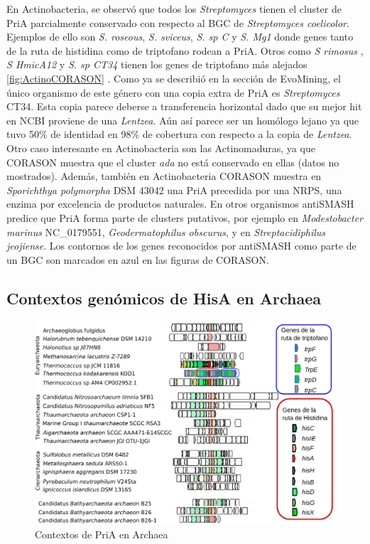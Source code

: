 \documentclass[12pt,twoside]{reedthesis}
\begin{document}
  En Actinobacteria, se observó que todos los \emph{Streptomyces} tienen
  el cluster de PriA parcialmente conservado con respecto al BGC de
  \emph{Streptomyces coelicolor}. Ejemplos de ello son \emph{S. roseous},
  \emph{S. sviceus}, \emph{S. sp C} y \emph{S. Mg1} donde genes tanto de
  la ruta de histidina como de triptofano rodean a PriA. Otros como
  \emph{S rimosus} , \emph{S HmicA12} y \emph{S. sp CT34} tienen los genes
  de triptofano más alejados \autoref{fig:ActinoCORASON} . Como ya se
  describió en la sección de EvoMining, el único organismo de este género
  con una copia extra de PriA es \emph{Streptomyces} CT34. Esta copia
  parece deberse a transferencia horizontal dado que su mejor hit en NCBI
  proviene de una \emph{Lentzea}. Aún así parece ser un homólogo lejano ya
  que tuvo 50\% de identidad en 98\% de cobertura con respecto a la copia
  de \emph{Lentzea}. Otro caso interesante en Actinobacteria son las
  Actinomaduras, ya que CORASON muestra que el cluster \emph{ada} no está
  conservado en ellas (datos no mostrados). Además, también en
  Actinobacteria CORASON muestra en \emph{Sporichthya polymorpha} DSM
  43042 una PriA precedida por una NRPS, una enzima por excelencia de
  productos naturales. En otros organismos antiSMASH predice que PriA
  forma parte de clusters putativos, por ejemplo en \emph{Modestobacter
  marinus} NC\_0179551, \emph{Geodermatophilus obscurus}, y en
  \emph{Streptacidiphilus jeojiense}. Los contornos de los genes
  reconocidos por antiSMASH como parte de un BGC son marcados en azul en
  las figuras de CORASON.
  
  \subsection{Contextos genómicos de HisA en
  Archaea}\label{contextos-genomicos-de-hisa-en-archaea}
  
  \begin{figure}[h!tbp]
  \centering
  \includegraphics[angle = 0,scale = 0.8]{chapter4/CORASON/ArchaeaCORASON.pdf}
  \caption[Contextos de PriA en Archaea]{\footnotesize{Contextos de PriA en Archaea}}
  \label{fig:ArchaeaCORASON}
  \end{figure}
  
\end{document}
